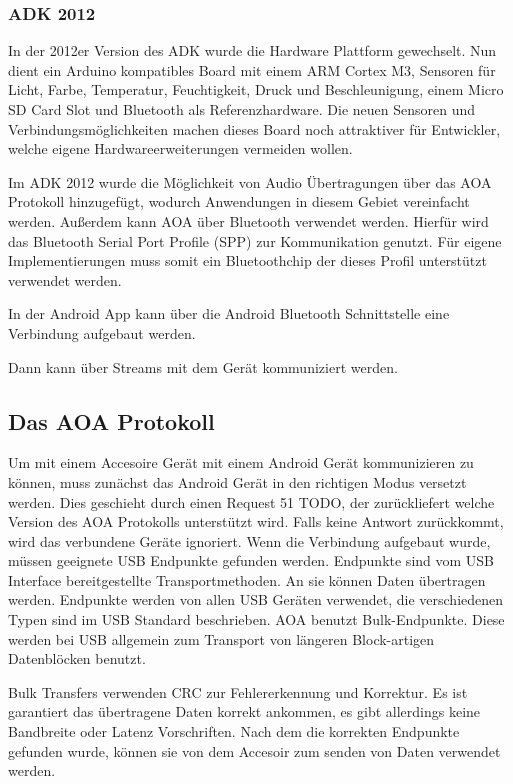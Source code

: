 \documentclass[12pt,journal,compsoc]{IEEEtran}
\begin{document}
\subsubsection{ADK 2012}
In der 2012er Version des ADK wurde die Hardware Plattform gewechselt. Nun dient ein Arduino kompatibles Board mit einem ARM Cortex M3, Sensoren für Licht, Farbe, Temperatur, Feuchtigkeit, Druck und Beschleunigung, einem Micro SD Card Slot und Bluetooth als Referenzhardware.
Die neuen Sensoren und Verbindungsmöglichkeiten machen dieses Board noch attraktiver für Entwickler, welche eigene Hardwareerweiterungen vermeiden wollen.

Im ADK 2012 wurde die Möglichkeit von Audio Übertragungen über das AOA Protokoll hinzugefügt, wodurch Anwendungen in diesem Gebiet vereinfacht werden.
Außerdem kann AOA über Bluetooth verwendet werden. Hierfür wird das Bluetooth Serial Port Profile (SPP) zur Kommunikation genutzt. Für eigene Implementierungen muss somit ein Bluetoothchip der dieses Profil unterstützt verwendet werden.


In der Android App kann über die Android Bluetooth Schnittstelle eine Verbindung aufgebaut werden.

Dann kann über Streams mit dem Gerät kommuniziert werden.

\subsection{Das AOA Protokoll}
Um mit einem Accesoire Gerät mit einem Android Gerät kommunizieren zu können, muss zunächst das Android Gerät in den richtigen Modus versetzt werden.
Dies geschieht durch einen Request 51 TODO, der zurückliefert welche Version des AOA Protokolls unterstützt wird. Falls keine Antwort zurückkommt, wird das verbundene Geräte ignoriert.
Wenn die Verbindung aufgebaut wurde, müssen geeignete USB Endpunkte gefunden werden. Endpunkte sind vom USB Interface bereitgestellte Transportmethoden. An sie können Daten übertragen werden.
Endpunkte werden von allen USB Geräten verwendet, die verschiedenen Typen sind im USB Standard beschrieben.
AOA benutzt Bulk-Endpunkte. Diese werden bei USB allgemein zum Transport von längeren Block-artigen Datenblöcken benutzt.

Bulk Transfers verwenden CRC zur Fehlererkennung und Korrektur. Es ist garantiert das übertragene Daten korrekt ankommen, es gibt allerdings keine Bandbreite oder Latenz Vorschriften.
\cite{usbbulk}
Nach dem die korrekten Endpunkte gefunden wurde, können sie von dem Accesoir zum senden von Daten verwendet werden.
\end{document}
